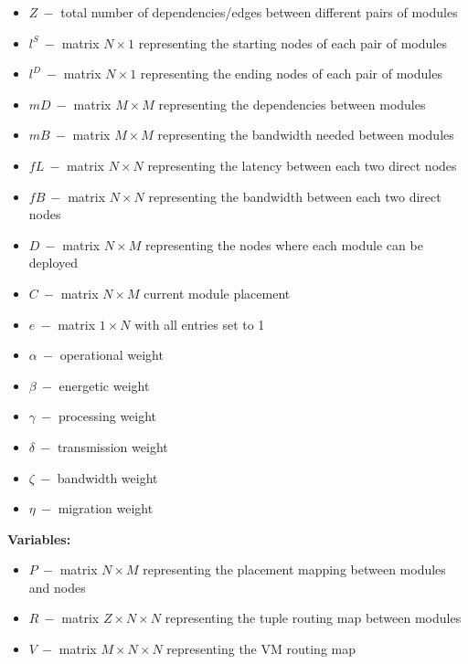 \documentclass{article}
\begin{document}
\begin{itemize}
	\item $Z~-$ total number of dependencies/edges between different pairs of modules
	\item $l^S~-$ matrix $N\times 1$ representing the starting nodes of each pair of modules
	\item $l^D~-$ matrix $N\times 1$ representing the ending nodes of each pair of modules\\
	
	\item $mD~-$ matrix $M\times M$ representing the dependencies between modules
	\item $mB~-$ matrix $M\times M$ representing the bandwidth needed between modules\\
	
	\item $fL~-$ matrix $N\times N$ representing the latency between each two direct nodes
	\item $fB~-$ matrix $N\times N$ representing the bandwidth between each two direct nodes\\
	
	\item $D~-$ matrix $N\times M$ representing the nodes where each module can be deployed
	\item $C~-$ matrix $N\times M$ current module placement\\
	
	\item $e~-$ matrix $1\times N$ with all entries set to 1\\
	
	\item $\alpha~-$ operational weight
	\item $\beta~-$ energetic weight
	\item $\gamma~-$ processing weight
	\item $\delta~-$ transmission weight
	\item $\zeta~-$ bandwidth weight
	\item $\eta~-$ migration weight
\end{itemize}

\pagebreak
\noindent\textbf{Variables:}
\begin{itemize}
	\item $P~-$ matrix $N\times M$ representing the placement mapping between modules and nodes
	\item $R~-$ matrix $Z\times N\times N$ representing the tuple routing map between modules
	\item $V~-$ matrix $M\times N\times N$ representing the VM routing map
\end{itemize}
\vspace*{12pt}
\end{document}
